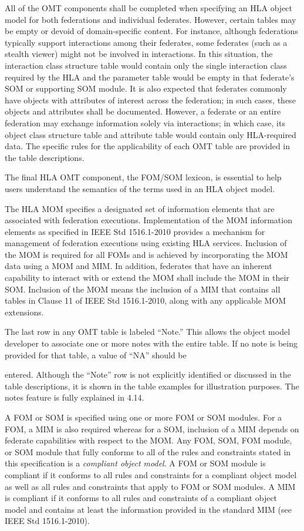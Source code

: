 All of the OMT components shall be completed when specifying an HLA object model for both federations and individual federates. However, certain tables may be empty or devoid of domain-specific content. For instance, although federations typically support interactions among their federates, some federates (such as a stealth viewer) might not be involved in interactions. In this situation, the interaction class structure table would contain only the single interaction class required by the HLA and the parameter table would be empty in that federate's SOM or supporting SOM module. It is also expected that federates commonly have objects with attributes of interest across the federation; in such cases, these objects and attributes shall be documented. However, a federate or an entire federation may exchange information solely via interactions; in which case, its object class structure table and attribute table would contain only HLA-required data. The specific rules for the applicability of each OMT table are provided in the table descriptions.

The final HLA OMT component, the FOM/SOM lexicon, is essential to help users understand the semantics of the terms used in an HLA object model.

The HLA MOM specifies a designated set of information elements that are associated with federation executions. Implementation of the MOM information elements as specified in IEEE Std 1516.1-2010 provides a mechanism for management of federation executions using existing HLA services. Inclusion of the MOM is required for all FOMs and is achieved by incorporating the MOM data using a MOM and MIM. In addition, federates that have an inherent capability to interact with or extend the MOM shall include the MOM in their SOM. Inclusion of the MOM means the inclusion of a MIM that contains all tables in Clause 11 of IEEE Std 1516.1-2010, along with any applicable MOM extensions.

The last row in any OMT table is labeled ``Note.'' This allows the object model developer to associate one or more notes with the entire table. If no note is being provided for that table, a value of ``NA'' should be

\newpage
entered. Although the ``Note'' row is not explicitly identified or discussed in the table descriptions, it is shown in the table examples for illustration purposes. The notes feature is fully explained in 4.14.

A FOM or SOM is specified using one or more FOM or SOM modules. For a FOM, a MIM is also required whereas for a SOM, inclusion of a MIM depends on federate capabilities with respect to the MOM. Any FOM, SOM, FOM module, or SOM module that fully conforms to all of the rules and constraints stated in this specification is a \textit{compliant object model}. A FOM or SOM module is compliant if it conforms to all rules and constraints for a compliant object model as well as all rules and constraints that apply to FOM or SOM modules. A MIM is compliant if it conforms to all rules and constraints of a compliant object model and contains at least the information provided in the standard MIM (see IEEE Std 1516.1-2010).

